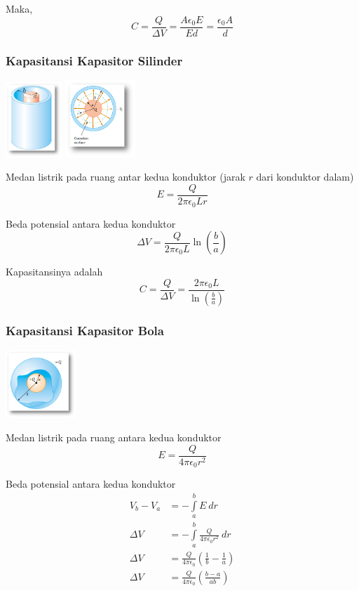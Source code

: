 \documentclass[twocolumn, 11pt]{article}%
\begin{document}
    Maka,
    \[C=\frac{Q}{\Delta V}=\frac{A\epsilon_0 E}{Ed}=\frac{\epsilon_0A}d \]

    \subsubsection{Kapasitansi Kapasitor Silinder}%
    \begin{center}
        \includegraphics[width=80px]{5.png}
        \includegraphics[width=100px]{6.png}
    \end{center}

    Medan listrik pada ruang antar kedua konduktor (jarak $r$ dari konduktor dalam)
    \[E=\frac{Q}{2\pi\epsilon_0Lr} \]

    Beda potensial antara kedua konduktor
    \[\Delta V=\frac{Q}{2\pi\epsilon_0L} \ln\left(\frac{b}a \right) \]

    Kapasitansinya adalah
    \[C=\frac{Q}{\Delta V}=\frac{2\pi\epsilon_0L}{\ln\left(\frac{b}a \right)} \]

    \subsubsection{Kapasitansi Kapasitor Bola}%
    \begin{center}
        \includegraphics[width=100px]{7.png}
    \end{center}

    Medan listrik pada ruang antara kedua konduktor
    \[E=\frac{Q}{4\pi\epsilon_0 r^2} \]

    Beda potensial antara kedua konduktor
    \begin{align*}
        V_b-V_a &=-\int\limits_a^b E\ dr\\
        \Delta V&=-\int\limits_a^b \frac{Q}{4\pi\epsilon_0 r^2}\ dr\\
        \Delta V&=\frac{Q}{4\pi\epsilon_0} \left(\frac1b - \frac1a \right)\\
        \Delta V&= \frac{Q}{4\pi\epsilon_0} \left(\frac{b-a}{ab}\right)
    \end{align*}
\end{document}
